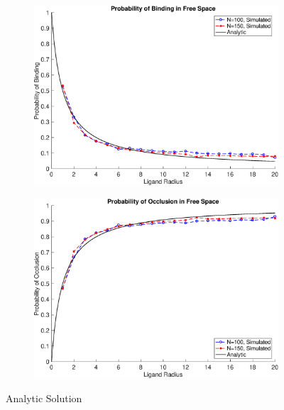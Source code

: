 \documentclass[../AdvancementSummary.tex]{subfiles}
\begin{document}
 \begin{figure}[H]
\begin{subfigure}{0.5\linewidth}
 \includegraphics[width=\linewidth]{ModelConfirmationFigures/BindingVSAnalyticN100N150.eps}
 \caption{}
 \end{subfigure}
 \begin{subfigure}{0.5\linewidth}
 \includegraphics[width=\linewidth]{ModelConfirmationFigures/OcclusionVSAnalyticN100N150.eps}
 \caption{}
 \end{subfigure}
  \caption{Analytic Solution \label{fig: AnalyticBinding}}
 \end{figure}
\end{document}
